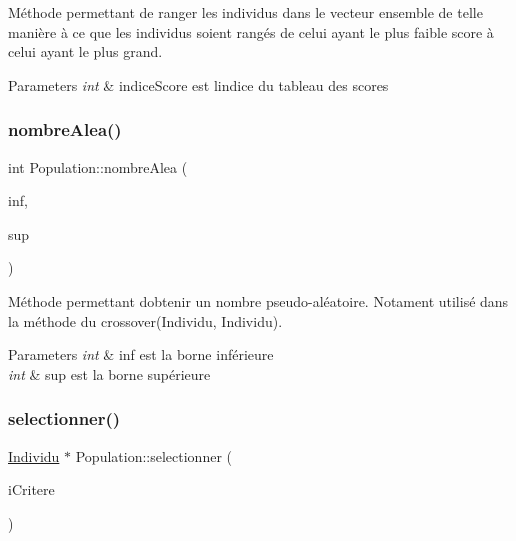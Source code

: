 Méthode permettant de ranger les individus dans le vecteur ensemble de telle manière à ce que les individus soient rangés de celui ayant le plus faible score à celui ayant le plus grand. 


\begin{DoxyParams}{Parameters}
{\em int} & indice\+Score est l\textquotesingle{}indice du tableau des scores \\
\hline
\end{DoxyParams}
\mbox{\label{class_population_a0bacc7dadc8ab903261ff053344a9e36}} 
\subsubsection{\texorpdfstring{nombre\+Alea()}{nombreAlea()}}
{\footnotesize\ttfamily int Population\+::nombre\+Alea (\begin{DoxyParamCaption}\item[{int}]{inf,  }\item[{int}]{sup }\end{DoxyParamCaption})}



Méthode permettant d\textquotesingle{}obtenir un nombre pseudo-\/aléatoire. Notament utilisé dans la méthode du crossover(\+Individu, Individu). 


\begin{DoxyParams}{Parameters}
{\em int} & inf est la borne inférieure \\
\hline
{\em int} & sup est la borne supérieure \\
\hline
\end{DoxyParams}
\mbox{\label{class_population_a30fcbcf36eb009493208310fecdf3729}} 
\subsubsection{\texorpdfstring{selectionner()}{selectionner()}}
{\footnotesize\ttfamily \hyperlink{class_individu}{Individu} $\ast$ Population\+::selectionner (\begin{DoxyParamCaption}\item[{int}]{i\+Critere }\end{DoxyParamCaption})}




